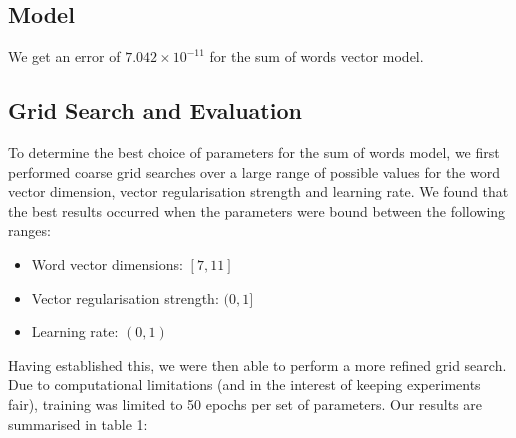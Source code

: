 \documentclass{article} %
\begin{document}
\subsection{Model}

We get an error of $7.042 \times 10^{-11}$ for the sum of words vector model.

\subsection{Grid Search and Evaluation}

To determine the best choice of parameters for the sum of words model, we first performed  coarse grid searches over a large range of possible values for the word vector dimension, vector regularisation strength and learning rate. We found that the best results occurred when the parameters were bound between the following ranges:

\begin{itemize}

\item Word vector dimensions: $[7, 11]$
\item Vector regularisation strength: $(0, 1]$
\item Learning rate: $(0, 1)$

\end{itemize}

Having established this, we were then able to perform a more refined grid search. Due to computational limitations (and in the interest of keeping experiments fair), training was limited to 50 epochs per set of parameters. Our results are summarised in table 1:
\end{document}
